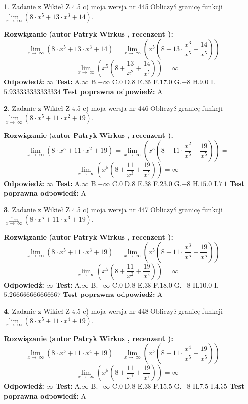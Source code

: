 \documentclass[12pt, a4paper]{article}
\theoremstyle{definition} %
\newtheorem{zad}{}
\newcommand{\zadStart}[1]{\begin{zad}#1\newline}
\newcommand{\zadStop}{\end{zad}}
\newcommand{\rozwStart}[2]{\noindent \textbf{Rozwiązanie (autor #1 , recenzent #2): }\newline}
\newcommand{\rozwStop}{\newline}
\newcommand{\odpStart}{\noindent \textbf{Odpowiedź:}\newline}
\newcommand{\odpStop}{\newline}
\newcommand{\testStart}{\noindent \textbf{Test:}\newline}
\newcommand{\testStop}{\newline}
\newcommand{\kluczStart}{\noindent \textbf{Test poprawna odpowiedź:}\newline}
\newcommand{\kluczStop}{\newline}
\begin{document}
\zadStart{Zadanie z Wikieł Z 4.5 c) moja wersja nr 445}
Obliczyć granicę funkcji  $\lim\limits_{x\to\ \infty}(8 \cdot x^{5}+13 \cdot x^{3}+14)$.
\zadStop
\rozwStart{Patryk Wirkus}{}
$$\lim\limits_{x\to\ \infty}(8 \cdot x^{5}+13 \cdot x^{3}+14) = \lim\limits_{x\to\ \infty}(x^{5}(8 +13 \cdot \frac{x^{3}}{x^{5}}+\frac{14}{x^{5}})) =$$ $$\lim\limits_{x\to\ \infty}(x^{5}(8 +\frac{13}{x^{2}}+\frac{14}{x^{5}})) =\infty$$
\rozwStop
\odpStart
$\infty$
\odpStop
\testStart
A.$\infty$ B.$-\infty$ C.$0$ D.$8$ E.$35$
F.$17.0$ G.$-8$
H.$9.0$
I.$5.933333333333334$
\testStop
\kluczStart
A
\kluczStop



\zadStart{Zadanie z Wikieł Z 4.5 c) moja wersja nr 446}
Obliczyć granicę funkcji  $\lim\limits_{x\to\ \infty}(8 \cdot x^{5}+11 \cdot x^{2}+19)$.
\zadStop
\rozwStart{Patryk Wirkus}{}
$$\lim\limits_{x\to\ \infty}(8 \cdot x^{5}+11 \cdot x^{2}+19) = \lim\limits_{x\to\ \infty}(x^{5}(8 +11 \cdot \frac{x^{2}}{x^{5}}+\frac{19}{x^{5}})) =$$ $$\lim\limits_{x\to\ \infty}(x^{5}(8 +\frac{11}{x^{3}}+\frac{19}{x^{5}})) =\infty$$
\rozwStop
\odpStart
$\infty$
\odpStop
\testStart
A.$\infty$ B.$-\infty$ C.$0$ D.$8$ E.$38$
F.$23.0$ G.$-8$
H.$15.0$
I.$7.1$
\testStop
\kluczStart
A
\kluczStop



\zadStart{Zadanie z Wikieł Z 4.5 c) moja wersja nr 447}
Obliczyć granicę funkcji  $\lim\limits_{x\to\ \infty}(8 \cdot x^{5}+11 \cdot x^{3}+19)$.
\zadStop
\rozwStart{Patryk Wirkus}{}
$$\lim\limits_{x\to\ \infty}(8 \cdot x^{5}+11 \cdot x^{3}+19) = \lim\limits_{x\to\ \infty}(x^{5}(8 +11 \cdot \frac{x^{3}}{x^{5}}+\frac{19}{x^{5}})) =$$ $$\lim\limits_{x\to\ \infty}(x^{5}(8 +\frac{11}{x^{2}}+\frac{19}{x^{5}})) =\infty$$
\rozwStop
\odpStart
$\infty$
\odpStop
\testStart
A.$\infty$ B.$-\infty$ C.$0$ D.$8$ E.$38$
F.$18.0$ G.$-8$
H.$10.0$
I.$5.266666666666667$
\testStop
\kluczStart
A
\kluczStop



\zadStart{Zadanie z Wikieł Z 4.5 c) moja wersja nr 448}
Obliczyć granicę funkcji  $\lim\limits_{x\to\ \infty}(8 \cdot x^{5}+11 \cdot x^{4}+19)$.
\zadStop
\rozwStart{Patryk Wirkus}{}
$$\lim\limits_{x\to\ \infty}(8 \cdot x^{5}+11 \cdot x^{4}+19) = \lim\limits_{x\to\ \infty}(x^{5}(8 +11 \cdot \frac{x^{4}}{x^{5}}+\frac{19}{x^{5}})) =$$ $$\lim\limits_{x\to\ \infty}(x^{5}(8 +\frac{11}{x^{1}}+\frac{19}{x^{5}})) =\infty$$
\rozwStop
\odpStart
$\infty$
\odpStop
\testStart
A.$\infty$ B.$-\infty$ C.$0$ D.$8$ E.$38$
F.$15.5$ G.$-8$
H.$7.5$
I.$4.35$
\testStop
\kluczStart
A
\kluczStop
\end{document}
